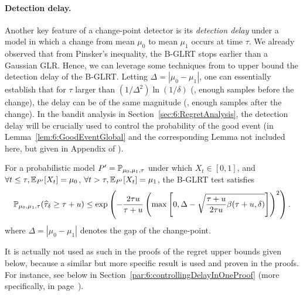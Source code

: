\paragraph{Detection delay.}
%
Another key feature of a change-point detector is its \emph{detection delay} under a model in which a change from mean $\mu_0$ to mean $\mu_1$ occurs at time $\tau$. We already observed that from Pinsker's inequality, the B-GLRT stops earlier than a Gaussian GLR.
Hence, we can leverage some techniques from \cite{Maillard2018GLR} to upper bound the detection delay of the B-GLRT. Letting $\Delta = |\mu_0 - \mu_1|$, one can essentially establish that for $\tau$ larger than $(1/\Delta^2)\ln(1/\delta)$ (\ie, enough samples before the change), the delay can be of the same magnitude (\ie, enough samples after the change).
In the bandit analysis in Section~\ref{sec:6:RegretAnalysis}, the detection delay will be crucially used to control the probability of the good event (in Lemma~\ref{lem:6:GoodEventGlobal} and the corresponding Lemma not included here, but given in Appendix of \cite{Besson2019GLRT}).

\begin{lemma}\label{lem:6:Delay}
\begin{leftbar}[lemmabar]  %
    For a probabilistic model $P' = \mathbb{P}_{\mu_0,\mu_1,\tau}$ under which $X_t \in [0,1]$,
    and $\forall t \leq \tau, \mathbb{E}_{P'}[X_t] = \mu_0$,
    $\forall t > \tau, \mathbb{E}_{P'}[X_t] = \mu_1$,
    the B-GLRT test satisfies
    \begin{equation}
        \mathbb{P}_{\mu_0,\mu_1,\tau} (\widehat{\tau}_{\delta} \geq \tau + u) \leq \exp\left( -\frac{2\tau u}{\tau + u}\left(\max\left[ 0, \Delta - \sqrt{\frac{\tau + u}{2\tau u} \beta(\tau + u,\delta)} \right]\right)^2 \right).
    \end{equation}
    where $\Delta = |\mu_0 - \mu_1|$ denotes the gap of the change-point.
\end{leftbar}  %
\end{lemma}
%
\begin{smallproof}
    It is actually not used as such in the proofs of the regret upper bounds given below, because a similar but more specific result is used and proven in the proofs.
    For instance, see below in Section~\ref{par:6:controllingDelayInOneProof} (more specifically, in page~\pageref{par:6:controllingDelayInOneProof}).
\end{smallproof}

